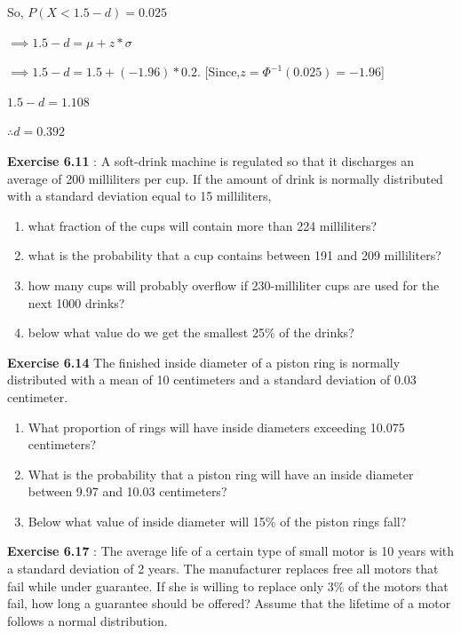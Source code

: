 \documentclass[
]{article}
\providecommand{\tightlist}{%
  \setlength{\itemsep}{0pt}\setlength{\parskip}{0pt}}
\begin{document}
So, \(P(X <1.5-d)=0.025\)

\(\implies 1.5-d=\mu+z*\sigma\)

\(\implies 1.5-d=1.5+(-1.96)*0.2\). {[}Since,\(z=\Phi^{-1}(0.025)=-1.96\){]}

\(1.5-d=1.108\)

\(\therefore d=0.392\)

\textbf{Exercise 6.11} : A soft-drink machine is regulated so that it discharges an average of 200 milliliters per cup. If the amount of drink is normally distributed with a standard deviation equal to 15 milliliters,

\begin{enumerate}
\def\labelenumi{(\alph{enumi})}
\tightlist
\item
  what fraction of the cups will contain more than 224 milliliters?
\item
  what is the probability that a cup contains between 191 and 209 milliliters?
\item
  how many cups will probably overflow if 230-milliliter cups are used for the next 1000 drinks?
\item
  below what value do we get the smallest 25\% of the drinks?
\end{enumerate}

\textbf{Exercise 6.14} The finished inside diameter of a piston ring is normally distributed with a mean of 10 centimeters and a standard deviation of 0.03 centimeter.

\begin{enumerate}
\def\labelenumi{(\alph{enumi})}
\tightlist
\item
  What proportion of rings will have inside diameters exceeding 10.075 centimeters?
\item
  What is the probability that a piston ring will have an inside diameter between 9.97 and 10.03 centimeters?
\item
  Below what value of inside diameter will 15\% of the piston rings fall?
\end{enumerate}

\textbf{Exercise 6.17} : The average life of a certain type of small motor is 10 years with a standard deviation of 2 years. The manufacturer replaces free all motors that fail while under guarantee. If she is willing to replace only 3\% of the motors that fail, how long a guarantee should be offered? Assume that the lifetime of a motor follows a normal distribution.

  
\end{document}
